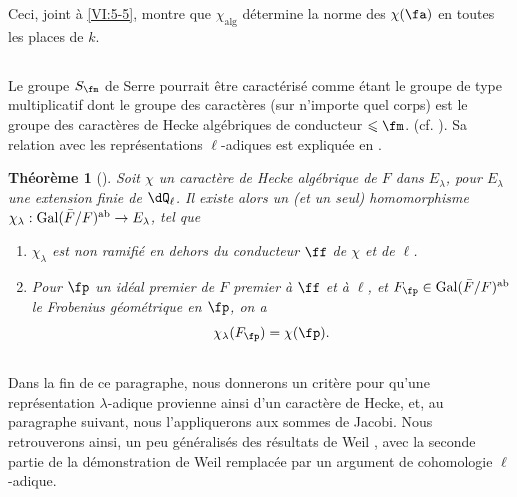 \documentclass[oneside]{book}
\DeclareMathOperator{\gal}{Gal}
\theoremstyle{sga-source}
\theoremstyle{sga-source-dash}
\theoremstyle{sga-source-dotdash}
\theoremstyle{sga-source-number-note-dash}
\theoremstyle{sga-source-note-number-dotdash}
\theoremstyle{sga-source-example-dotdash}
\theoremstyle{sga-source-inline-number}
\theoremstyle{sga-source-bare-number}
\theoremstyle{sga-source}
\newtheorem{theorem_}[subsection]{Théorème}
\newcommand{\PrintPage}[1]{}\newcommand{\MathPage}[1]{}\newcommand{\PrintCite}[2]{#1}\newcommand{\var}[3]{#1}
\begin{document}
\PrintPage{211}
Ceci, joint à \ref{VI:5-5}, montre que $\chi_\text{alg}$ détermine la norme 
des $\chi(\fa)$ en toutes les places de $k$. 





\subsection{}\label{VI:5-7}

Le groupe $S_\fm$ de Serre pourrait être caractérisé comme étant le 
groupe de type multiplicatif dont le groupe des caractères (sur n'importe 
quel corps) est le groupe des caractères de Hecke algébriques de conducteur 
$\leqslant \fm$. (cf. \cite[II 2.1 et 2.2]{se68}). Sa relation avec les 
représentations $\ell$-adiques est expliquée en \cite[II 2.3]{se68}. 





\begin{theorem_}[{\cite{se68}}]\label{VI:5-8}
Soit $\chi$ un caractère de Hecke algébrique de $F$ dans $E_\lambda$, pour 
$E_\lambda$ une extension finie de $\dQ_\ell$. Il existe alors un (et un seul) 
homomorphisme $\chi_\lambda:\gal(\bar F/F)^\textnormal{ab} \to E_\lambda$, tel 
que 
\begin{enumerate}[\indent (i)]
  \item $\chi_\lambda$ est non ramifié en dehors du conducteur $\ff$ de 
    $\chi$ et de $\ell$. 
  \item Pour $\fp$ un idéal premier de $F$ premier à $\ff$ et à $\ell$, 
    et $F_\fp\in \gal(\bar F/F)^\textnormal{ab}$ le Frobenius géométrique 
    en $\fp$, on a 
    \[
      \chi_\lambda(F_\fp) = \chi(\fp) \text{.}
    \] 
\end{enumerate}
\end{theorem_}





\subsection{}\label{VI:5-9}

Dans la fin de ce paragraphe, nous donnerons un critère pour qu'une 
représentation $\lambda$-adique provienne ainsi d'un caractère de Hecke, 
et, au paragraphe suivant, nous l'appliquerons aux sommes de Jacobi. Nous 
retrouverons ainsi, un peu généralisés des résultats de Weil 
\cite{we52,we74-2}, avec la seconde partie de la démonstration de Weil 
remplacée par un argument de cohomologie $\ell$-adique. 
\end{document}
